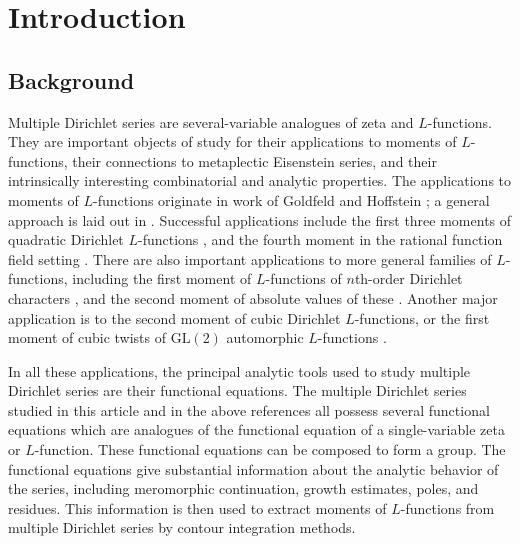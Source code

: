 \documentclass[11pt,letterpaper]{article}
\theoremstyle{definition}
\theoremstyle{remark}
\numberwithin{equation}{section}
\theoremstyle{dotless}
\begin{document}
\pagebreak

\section{Introduction} \label{SectionIntro}

\subsection{Background}

Multiple Dirichlet series are several-variable analogues of zeta and $L$-functions. They are important objects of study for their applications to moments of $L$-functions, their connections to metaplectic Eisenstein series, and their intrinsically interesting combinatorial and analytic properties. The applications to moments of $L$-functions originate in work of Goldfeld and Hoffstein \cite{GoldfeldHoffstein}; a general approach is laid out in \cite{DiaconuGoldfeldHoffstein}. Successful applications include the first three moments of quadratic Dirichlet $L$-functions \cite{DiaconuGoldfeldHoffstein, Diaconu, DiaconuWhitehead}, and the fourth moment in the rational function field setting \cite{BucurDiaconu, DiaconuPasolPopa}. There are also important applications to more general families of $L$-functions, including the first moment of $L$-functions of $n$th-order Dirichlet characters \cite{FriedbergHoffsteinLieman}, and the second moment of absolute values of these  \cite{Diaconu2004}. Another major application is to the second moment of cubic Dirichlet $L$-functions, or the first moment of cubic twists of $\mathrm{GL}(2)$ automorphic $L$-functions \cite{BrubakerThesis, BrubakerFriedbergHoffstein}.

In all these applications, the principal analytic tools used to study multiple Dirichlet series are their functional equations. The multiple Dirichlet series studied in this article and in the above references all possess several functional equations which are analogues of the functional equation of a single-variable zeta or $L$-function. These functional equations can be composed to form a group. The functional equations give substantial information about the analytic behavior of the series, including meromorphic continuation, growth estimates, poles, and residues. This information is then used to extract moments of $L$-functions from multiple Dirichlet series by contour integration methods. 
\end{document}

